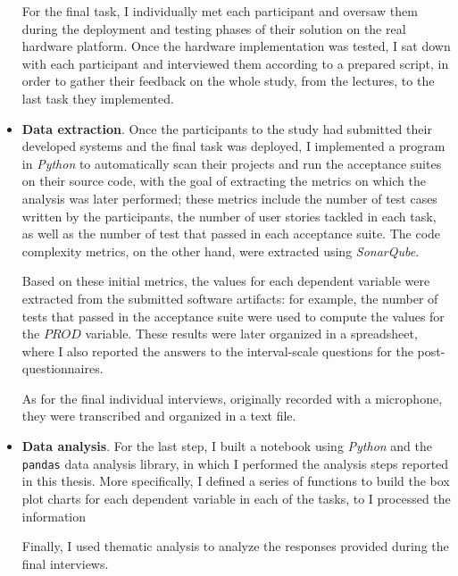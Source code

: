 \begin{itemize}
    For the final task, I individually met each participant and oversaw them during the deployment and testing phases of their solution on the real hardware platform.
    Once the hardware implementation was tested, I sat down with each participant and interviewed them according to a prepared script, in order to gather their feedback on the whole study, from the lectures, to the last task they implemented.

    \item \textbf{Data extraction}. 
    Once the participants to the study had submitted their developed systems and the final task was deployed, I implemented a program in \textit{Python} to automatically scan their projects and run the acceptance suites on their source code, with the goal of extracting the metrics on which the analysis was later performed; these metrics include the number of test cases written by the participants, the number of user stories tackled in each task, as well as the number of test that passed in each acceptance suite.
    The code complexity metrics, on the other hand, were extracted using \textit{SonarQube}.

    Based on these initial metrics, the values for each dependent variable were extracted from the submitted software artifacts: for example, the number of tests that passed in the acceptance suite were used to compute the values for the $PROD$ variable.
    These results were later organized in a spreadsheet, where I also reported the answers to the interval-scale questions for the post-questionnaires.

    As for the final individual interviews, originally recorded with a microphone, they were transcribed and organized in a text file.

    \item\textbf{Data analysis}.
    For the last step, I built a notebook using \textit{Python} and the \texttt{pandas} data analysis library, in which I performed the analysis steps reported in this thesis. More specifically, I defined a series of functions to build the box plot charts for each dependent variable in each of the tasks, to
    I processed the information

    Finally, I used thematic analysis to analyze the responses provided during the final interviews.
\end{itemize}
